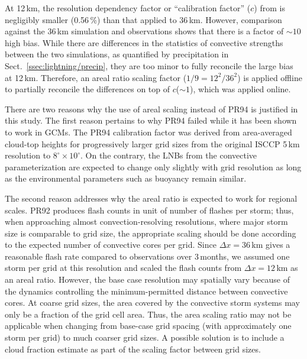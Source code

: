 At 12\,\unit{km}, the resolution dependency factor or ``calibration factor''
($c$) from \cite{Price:1994fk} is negligibly smaller (0.56\,{\%}) than that applied to
36\,\unit{km}. However, comparison against the 36\,\unit{km} simulation and
observations shows that there is a factor of $\sim10$ high bias. While there
are differences in the statistics of convective strengths between the two
simulations, as quantified by precipitation in Sect.~\ref{ssec:lightning/precip},
they are too minor to fully reconcile the large bias at 12\,\unit{km}.
Therefore, an areal ratio scaling factor ($1/9 = 12^2/36^2$) is applied
offline to partially reconcile the differences on top of $c$($\sim1$), which
was applied online.

There are two reasons why the use of areal scaling instead of PR94 is
justified in this study. The first reason pertains to why PR94 failed while
it has been shown to work in GCMs. The PR94 calibration factor was derived
from area-averaged cloud-top heights for progressively larger grid sizes from
the original ISCCP 5\,\unit{km} resolution to $8^\circ\times10^\circ$. On the
contrary, the LNBs from the convective parameterization are expected to
change only slightly with grid resolution as long as the environmental
parameters such as buoyancy remain similar.

The second reason addresses why the areal ratio is expected to work for
regional scales. PR92 produces flash counts in unit of number of flashes per
storm; thus, when approaching almost convection-resolving resolutions, where
major storm size is comparable to grid size, the appropriate scaling should
be done according to the expected number of convective cores per grid. Since
$\Delta x=36$\,\unit{km} gives a reasonable flash rate compared to
observations over 3\,months, we assumed one storm per grid at this resolution
and scaled the flash counts from $\Delta x=12$\,\unit{km} as an areal ratio.
However, the base case resolution may spatially vary because of the dynamics
controlling the minimum-permitted distance between convective cores. At
coarse grid sizes, the area covered by the convective storm systems may only
be a fraction of the grid cell area. Thus, the area scaling ratio may not be
applicable when changing from base-case grid spacing (with approximately one
storm per grid) to much coarser grid sizes. A possible solution is to include
a cloud fraction estimate as part of the scaling factor between grid sizes.

